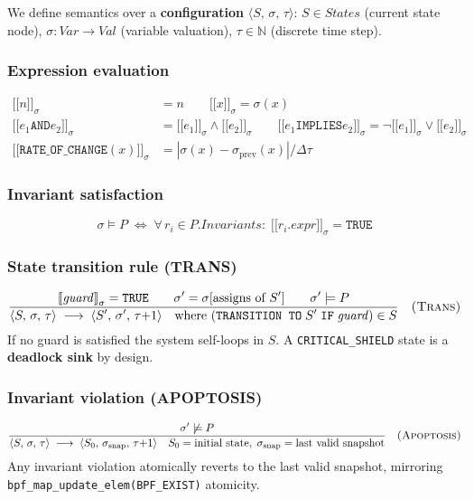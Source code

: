 \documentclass[11pt,a4paper,twoside]{article}
\newcommand{\sem}[1]{\mathopen{[\![}#1\mathclose{]\!]}}
\newcommand{\tm}[1]{\texttt{#1}}
\newcommand{\irule}[3]{\dfrac{\displaystyle #1}{\displaystyle #2}\quad\textsc{(#3)}}
\begin{document}
We define semantics over a \textbf{configuration} $\langle S,\,\sigma,\,\tau\rangle$:
$S \in \textit{States}$ (current state node),
$\sigma : \textit{Var} \to \textit{Val}$ (variable valuation),
$\tau \in \mathbb{N}$ (discrete time step).

\subsubsection{Expression evaluation}
\begin{align*}
\sem{n}_\sigma &= n \qquad \sem{x}_\sigma = \sigma(x) \\
\sem{e_1 \mathbin{\tm{AND}} e_2}_\sigma &= \sem{e_1}_\sigma \wedge \sem{e_2}_\sigma \qquad
\sem{e_1 \mathbin{\tm{IMPLIES}} e_2}_\sigma = \neg\sem{e_1}_\sigma \vee \sem{e_2}_\sigma \\
\sem{\tm{RATE\_OF\_CHANGE}(x)}_\sigma &= {|\sigma(x) - \sigma_{\mathrm{prev}}(x)|}/{\Delta\tau}
\end{align*}

\subsubsection{Invariant satisfaction}
\[
  \sigma \models P \;\iff\; \forall\, r_i \in P.\textit{Invariants}:\; \sem{r_i.\textit{expr}}_\sigma = \tm{TRUE}
\]

\subsubsection{State transition rule (TRANS)}
\[
\irule{
  \sem{\mathit{guard}}_\sigma = \tm{TRUE} \qquad
  \sigma' = \sigma[\text{assigns of }S'] \qquad
  \sigma' \models P
}{
  \langle S,\,\sigma,\,\tau\rangle \;\longrightarrow\; \langle S',\,\sigma',\,\tau{+}1\rangle
  \quad \text{where } (\tm{TRANSITION TO}\;S'\;\tm{IF}\;\mathit{guard})\in S
}{Trans}
\]
If no guard is satisfied the system self-loops in $S$.
A \tm{CRITICAL\_SHIELD} state is a \textbf{deadlock sink} by design.

\subsubsection{Invariant violation (APOPTOSIS)}
\[
\irule{
  \sigma' \not\models P
}{
  \langle S,\,\sigma,\,\tau\rangle \;\longrightarrow\;
  \langle S_0,\,\sigma_{\mathrm{snap}},\,\tau{+}1\rangle \quad
  S_0 = \text{initial state},\; \sigma_{\mathrm{snap}} = \text{last valid snapshot}
}{Apoptosis}
\]
Any invariant violation atomically reverts to the last valid snapshot,
mirroring \texttt{bpf\_map\_update\_elem(BPF\_EXIST)} atomicity.
\end{document}
